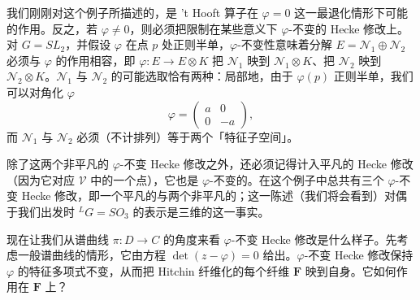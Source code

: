\documentclass[11pt,a4paper]{article}
\begin{document}

我们刚刚对这个例子所描述的，是 't Hooft 算子在 $\varphi=0$ 这一最退化情形下可能的作用。反之，若 $\varphi\neq0$，则必须把限制在某些意义下 $\varphi$-不变的 Hecke 修改上。对 $G=SL_2$，并假设 $\varphi$ 在点 $p$ 处正则半单，$\varphi$-不变性意味着分解 $E=\mathcal{N}_1\oplus\mathcal{N}_2$ 必须与 $\varphi$ 的作用相容，即 $\varphi:E\to E\otimes K$ 把 $\mathcal{N}_1$ 映到 $\mathcal{N}_1\otimes K$、把 $\mathcal{N}_2$ 映到 $\mathcal{N}_2\otimes K$。$\mathcal{N}_1$ 与 $\mathcal{N}_2$ 的可能选取恰有两种：局部地，由于 $\varphi(p)$ 正则半单，我们可以对角化 $\varphi$
\begin{equation}\tag{5.26}
\varphi=\begin{pmatrix}
a & 0\\
0 & -a
\end{pmatrix},
\end{equation}
而 $\mathcal{N}_1$ 与 $\mathcal{N}_2$ 必须（不计排列）等于两个「特征子空间」。



除了这两个非平凡的 $\varphi$-不变 Hecke 修改之外，还必须记得计入平凡的 Hecke 修改（因为它对应 $\mathcal{V}$ 中的一个点），它也是 $\varphi$-不变的。在这个例子中总共有三个 $\varphi$-不变 Hecke 修改，即一个平凡的与两个非平凡的；这一陈述（我们将会看到）对偶于我们出发时 ${}^{L}G=SO_3$ 的表示是三维的这一事实。

现在让我们从谱曲线 $\pi:D\to C$ 的角度来看 $\varphi$-不变 Hecke 修改是什么样子。先考虑一般谱曲线的情形，它由方程 $\det(z-\varphi)=0$ 给出。$\varphi$-不变 Hecke 修改保持 $\varphi$ 的特征多项式不变，从而把 Hitchin 纤维化的每个纤维 $\boldsymbol{F}$ 映到自身。它如何作用在 $\boldsymbol{F}$ 上？
\end{document}
